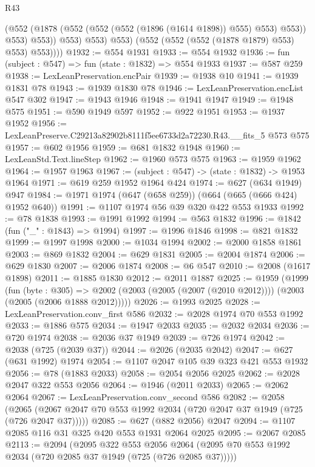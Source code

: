 \begin{lexlean}{R43}
\begin{coremodule}
                    (@552 (@1878 (@552 (@552 (@552 (@1896 (@1614 @1898)) @555) @553) @553)) @553)
                    @553))
                @553)
              @553)
            @553)
          (@552 (@552 (@552 (@1878 @1879) @553) @553) @553))))
@1932 := @554 @1931
@1933 := @554 @1932
@1936 := fun (subject : @547) => fun (state : @1832) => @554 @1933
@1937 := @587 @259
@1938 := LexLeanPreservation.encPair
@1939 := @1938 @10
@1941 := @1939 @1831 @78
@1943 := @1939 @1830 @78
@1946 := LexLeanPreservation.encList @547 @302
@1947 := @1943 @1946
@1948 := @1941 @1947
@1949 := @1948 @575
@1951 := @590 @1949 @597
@1952 := @922 @1951
@1953 := @1937 @1952
@1956 := LexLeanPreserve.C29213a82902b8111f5ee6733d2a72230.R43.__fits_5 @573 @575
@1957 := @602 @1956
@1959 := @681 @1832 @1948
@1960 := LexLeanStd.Text.lineStep
@1962 := @1960 @573 @575
@1963 := @1959 @1962
@1964 := @1957 @1963
@1967 := (subject : @547) -> (state : @1832) -> @1953 @1964
@1971 := @619 @259 @1952 @1964 @424
@1974 := @627 (@634 @1949) @947
@1984 := @1971 @1974 (@647 (@658 @259)) (@664 (@665 (@666 @424) @1952 @640))
@1991 := @1107 @1974 @56 @39 @320 @422 @553 @1933
@1992 := @78 @1838
@1993 := @1991 @1992
@1994 := @563 @1832
@1996 := @1842 (fun ("_" : @1843) => @1994)
@1997 := @1996 @1846
@1998 := @821 @1832
@1999 := @1997 @1998
@2000 := @1034 @1994
@2002 := @2000 @1858 @1861
@2003 := @869 @1832
@2004 := @629 @1831
@2005 := @2004 @1874
@2006 := @629 @1830
@2007 := @2006 @1874
@2008 := @6 @547
@2010 := @2008 (@1617 @1898)
@2011 := @1885 @1830
@2012 := @2011 @1887
@2025 := @1959
    (@1999
      (fun (byte : @305) =>
      @2002 (@2003 (@2005 (@2007 (@2010 @2012)))) (@2003 (@2005 (@2006 @1888 @2012)))))
@2026 := @1993 @2025
@2028 := LexLeanPreservation.conv_first @586
@2032 := @2028 @1974 @70 @553 @1992
@2033 := @1886 @575
@2034 := @1947 @2033
@2035 := @2032 @2034
@2036 := @720 @1974
@2038 := @2036 @37 @1949
@2039 := @726 @1974
@2042 := @2038 (@725 (@2039 @37))
@2044 := @2026 (@2035 @2042)
@2047 := @627 (@631 @1992) @1974
@2054 := @1107 @2047 @105 @39 @323 @421 @553 @1932
@2056 := @78 (@1883 @2033)
@2058 := @2054 @2056 @2025
@2062 := @2028 @2047 @322 @553 @2056
@2064 := @1946 (@2011 @2033)
@2065 := @2062 @2064
@2067 := LexLeanPreservation.conv_second @586
@2082 := @2058
    (@2065 (@2067 @2047 @70 @553 @1992 @2034 (@720 @2047 @37 @1949 (@725 (@726 @2047 @37)))))
@2085 := @627 (@882 @2056) @2047
@2094 := @1107 @2085 @116 @31 @325 @420 @553 @1931 @2064 @2025
@2095 := @2067 @2085
@2113 := @2094
    (@2095
      @322
      @553
      @2056
      @2064
      (@2095 @70 @553 @1992 @2034 (@720 @2085 @37 @1949 (@725 (@726 @2085 @37)))))

\end{coremodule}
\end{lexlean}
